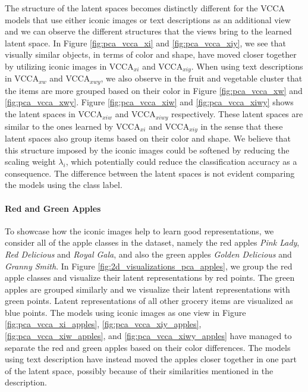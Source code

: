 The structure of the latent spaces becomes distinctly different for the VCCA models that use either iconic images or text descriptions as an additional view and we can observe the different structures that the views bring to the learned latent space. In Figure \ref{fig:pca_vcca_xi} and \ref{fig:pca_vcca_xiy}, we see that visually similar objects, in terms of color and shape, have moved closer together by utilizing iconic images in VCCA$_{x i}$ and VCCA$_{x i y}$. When using text descriptions in VCCA$_{x w}$ and VCCA$_{x w y}$, we also observe in the fruit and vegetable cluster that the items are more grouped based on their color in Figure \ref{fig:pca_vcca_xw} and \ref{fig:pca_vcca_xwy}. 
Figure \ref{fig:pca_vcca_xiw} and \ref{fig:pca_vcca_xiwy} shows the latent spaces in VCCA$_{x i w}$ and VCCA$_{x i w y}$ respectively. These latent spaces are similar to the ones learned by VCCA$_{x i}$ and VCCA$_{x i y}$ in the sense that these latent spaces also group items based on their color and shape. We believe that this structure imposed by the iconic images could be softened by reducing the scaling weight $\lambda_{i}$, which potentially could reduce the classification accuracy as a consequence. The difference between the latent spaces is not evident comparing the models using the class label.


\paragraph{Red and Green Apples} To showcase how the iconic images help to learn good representations, we consider all of the apple classes in the dataset, namely the red apples \textit{Pink Lady}, \textit{Red Delicious} and \textit{Royal Gala}, and also the green apples \textit{Golden Delicious} and \textit{Granny Smith}. In Figure \ref{fig:2d_visualizations_pca_apples}, we group the red apple classes and visualize their latent representations by red points. The green apples are grouped similarly and we visualize their latent representations with green points. Latent representations of all other grocery items are visualized as blue points. The models using iconic images as one view in Figure \ref{fig:pca_vcca_xi_apples}, \ref{fig:pca_vcca_xiy_apples}, \ref{fig:pca_vcca_xiw_apples}, and \ref{fig:pca_vcca_xiwy_apples} have managed to separate the red and green apples based on their color differences. The models using text description have instead moved the apples closer together in one part of the latent space, possibly because of their similarities mentioned in the description. 

